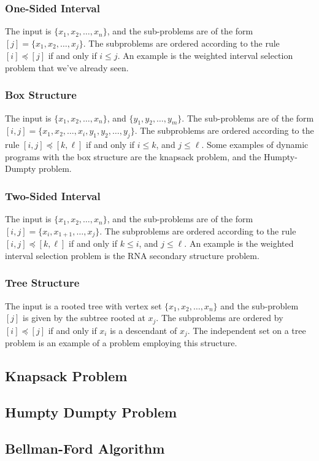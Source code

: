 \documentclass{article}
\begin{document}
\subsubsection{One-Sided Interval}
The input is $\{x_1, x_2, \dots, x_n\}$, and the sub-problems are of the form $[j] = \{x_1, x_2, \dots, x_j\}$. The subproblems are ordered according to the rule $[i] \preceq [j]$ if and only if $i \leq j$. An example is the weighted interval selection problem that we've already seen.
\subsubsection{Box Structure}
The input is $\{x_1, x_2, \dots, x_n\}$, and $\{y_1, y_2, \dots, y_m\}$. The sub-problems are of the form $[i, j] = \{x_1, x_2, \dots, x_i, y_1, y_2, \dots, y_j\}$. The subproblems are ordered according to the rule $[i, j] \preceq [k, \ell]$ if and only if $i \leq k$, and $j \leq \ell$. Some examples of dynamic programs with the box structure are the knapsack problem, and the Humpty-Dumpty problem.
\subsubsection{Two-Sided Interval}
The input is $\{x_1, x_2, \dots, x_n\}$, and the sub-problems are of the form $[i, j] = \{x_i, x_{1+1}, \dots, x_j\}$. The subproblems are ordered according to the rule $[i, j] \preceq [k, \ell]$ if and only if $k \leq i$, and $j \leq \ell$. An example is the weighted interval selection problem is the RNA secondary structure problem.
\subsubsection{Tree Structure}
The input is a rooted tree with vertex set $\{x_1, x_2, \dots, x_n\}$ and the sub-problem $[j]$ is given by the subtree rooted at $x_j$. The subproblems are ordered by $[i] \preceq [j]$ if and only if $x_i$ is a descendant of $x_j$. The independent set on a tree problem is an example of a problem employing this structure.
\subsection{Knapsack Problem}
\subsection{Humpty Dumpty Problem}
\subsection{Bellman-Ford Algorithm}
\end{document}
